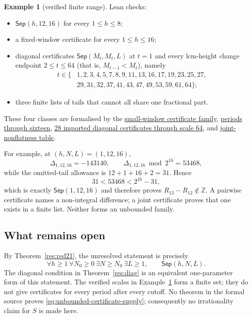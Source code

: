\documentclass[11pt]{article}
\newcommand{\commit}{312b96c0d149ed466725c62d4ef24cfc91bca34e}
\newcommand{\repobase}{https://github.com/wcook04/plectis-lean-erdos249-257/blob/\commit}
\newcommand{\PK}{Erdos249257}
\newcommand{\lword}[4]{\href{\repobase/\PK/#1\#L#2}{#4}}
\theoremstyle{definition}
\newtheorem{example}[theorem]{Example}
\theoremstyle{remark}
\newcommand{\Z}{\mathbb{Z}}
\begin{document}
\begin{example}[verified finite range]\label{res:deposits}
Lean checks:
\begin{itemize}[leftmargin=1.4em]
\item $\mathsf{Sep}(h,12,16)$ for every $1\le h\le8$;
\item a fixed-window certificate for every $1\le h\le16$;
\item diagonal certificates $\mathsf{Sep}(M_t,M_t,L)$ at $t=1$ and every
lcm-height change endpoint $2\le t\le64$ (that is, $M_{t-1}<M_t$), namely
\[
\begin{aligned}
t\in\{&1,2,3,4,5,7,8,9,11,13,16,17,19,23,25,27,\\
      &29,31,32,37,41,43,47,49,53,59,61,64\};
\end{aligned}
\]
\item three finite lists of tails that cannot all share one fractional part.
\end{itemize}
\end{example}
\noindent These four classes are formalised by the
\lword{TotientTailPeriodKiller.lean}{404}{certifiedKill_all_small}{small-window certificate family},
\lword{CarrySurvivorExtinction.lean}{574}{certifiedKill_all_upto_sixteen}{periods through sixteen},
\lword{DiagonalPincerCertificatesT64.lean}{1967}{certifiedKill_diagonal_all_imported_through_t64}{28 imported diagonal certificates through scale 64},
and
\lword{LcmConeNonflat.lean}{506}{coneNonflatCert_cells}{joint-nonflatness table}.

For example, at $(h,N,L)=(1,12,16)$,
\[
\Delta_{1,12,16}=-143140,\qquad
\Delta_{1,12,16}\bmod 2^{16}=53468,
\]
while the omitted-tail allowance is $12+1+16+2=31$.  Hence
\[
31<53468<2^{16}-31,
\]
which is exactly $\mathsf{Sep}(1,12,16)$ and therefore proves
$R_{13}-R_{12}\notin\Z$.  A pairwise certificate names a non-integral
difference; a joint certificate proves that one exists in a finite list.
Neither forms an unbounded family.

\subsection{What remains open}\label{sec:249-open}

By Theorem~\ref{res:red21}, the unresolved statement is precisely
\[
\forall h\ge1\ \forall N_0\ge0\ \exists N\ge N_0\ \exists L\ge1,\qquad
\mathsf{Sep}(h,N,L).
\tag{5.1}\label{eq:unbounded-certificate-supply}
\]
The diagonal condition in Theorem~\ref{res:diag} is an equivalent
one-parameter form of this statement.  The verified scales in
Example~\ref{res:deposits} form a finite set; they do not give certificates
for every period after every cutoff.  No theorem in the formal source proves
\eqref{eq:unbounded-certificate-supply}; consequently no irrationality claim
for $S$ is made here.
\end{document}
